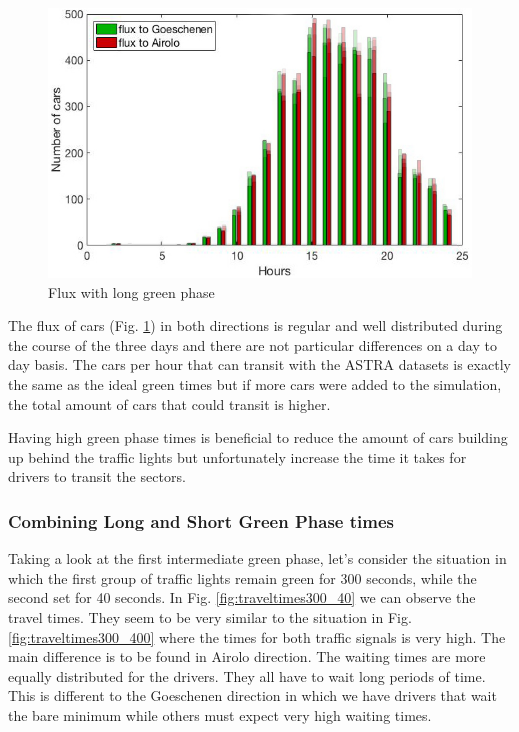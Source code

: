\documentclass[11pt,a4paper,parskip=half-]{article}
\begin{document}
\begin{figure}[h!]
\includegraphics[scale=0.62]{longbase_300400}
\centering
\vspace*{-4mm}
\caption{Flux with long green phase}
\label{fig:flux300_400}
\end{figure}


The flux of cars (Fig. \ref{fig:flux300_400}) in both directions is regular and well distributed during the course of the three days and there are not particular differences on a day to day basis. The cars per hour that can transit with the ASTRA datasets is exactly the same as the ideal green times but if more cars were added to the simulation, the total amount of cars that could transit is higher. 

Having high green phase times is beneficial to reduce the amount of cars building up behind the traffic lights but unfortunately increase the time it takes for drivers to transit the sectors.  





\vspace{5cm}

\subsubsection{Combining Long and Short Green Phase times}



Taking a look at the first intermediate green phase, let's consider the situation in which the first group of traffic lights remain green for 300 seconds, while the second set for 40 seconds. In Fig. \ref{fig:traveltimes300_40} we can observe the travel times. They seem to be very similar to the situation in Fig. \ref{fig:traveltimes300_400} where the times for both traffic signals is very high. The main difference is to be found in Airolo direction. The waiting times are more equally distributed for the drivers. They all have to wait long periods of time. This is different to the Goeschenen direction in which we have drivers that wait the bare minimum while others must expect very high waiting times.
\end{document}
